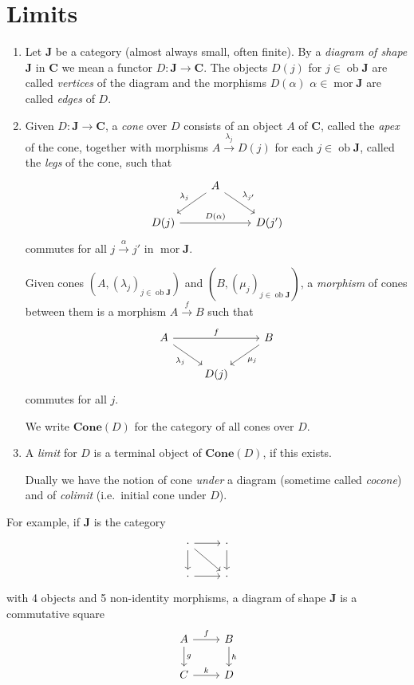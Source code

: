 \documentclass[a4paper]{article}
\renewcommand{\c}[1]{\mathbf{#1}}
\DeclareMathOperator{\ob}{ob}
\DeclareMathOperator{\mor}{mor}
\newcommand{\Cone}{{\c{Cone}}}
\begin{document}
\section{Limits}

\begin{definition}\leavevmode
  \begin{enumerate}
  \item Let \(\c J\) be a category (almost always small, often finite). By a \emph{diagram of shape \(\c J\)} in \(\c C\) we mean a functor \(D: \c J \to \c C\). The objects \(D(j)\) for \(j \in \ob \c J\) are called \emph{vertices} of the diagram and the morphisms \(D(\alpha)\) \(\alpha \in \mor \c J\) are called \emph{edges} of \(D\).
 \item Given \(D: \c J \to \c C\), a \emph{cone} over \(D\) consists of an object \(A\) of \(\c C\), called the \emph{apex} of the cone, together with morphisms \(A \xrightarrow{\lambda_j} D(j)\) for each \(j \in \ob \c J\), called the \emph{legs} of the cone, such that
    \[
      \begin{tikzcd}
        & A \ar[dl, "\lambda_j"'] \ar[dr, "\lambda_{j'}"] \\
        D(j) \ar[rr, "D(\alpha)"] && D(j')
      \end{tikzcd}
    \]
    commutes for all \(j \xrightarrow{\alpha} j'\) in \(\mor \c J\).

    Given cones \((A, (\lambda_j)_{j \in \ob \c J})\) and \((B, (\mu_j)_{j \in \ob \c J})\), a \emph{morphism} of cones between them is a morphism \(A \xrightarrow{f} B\) such that
    \[
      \begin{tikzcd}
        A \ar[dr, "\lambda_j"'] \ar[rr, "f"] && B \ar[dl, "\mu_j"] \\
        & D(j)
      \end{tikzcd}
    \]
    commutes for all \(j\).

    We write \(\Cone(D)\) for the category of all cones over \(D\).
  \item A \emph{limit} for \(D\) is a terminal object of \(\Cone(D)\), if this exists.

    Dually we have the notion of cone \emph{under} a diagram (sometime called \emph{cocone}) and of \emph{colimit} (i.e.\ initial cone under \(D\)).
  \end{enumerate}
\end{definition}

For example, if \(\c J\) is the category
\[
  \begin{tikzcd}
    \cdot \ar[r] \ar[d] \ar[dr] & \cdot \ar[d] \\
    \cdot \ar[r] & \cdot
  \end{tikzcd}
\]
with 4 objects and 5 non-identity morphisms, a diagram of shape \(\c J\) is a commutative square
\[
  \begin{tikzcd}
    A \ar[r, "f"] \ar[d, "g"] & B \ar[d, "h"] \\
    C \ar[r, "k"] & D
  \end{tikzcd}
\]
\end{document}
